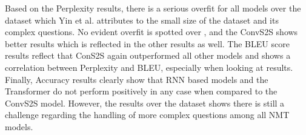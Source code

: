 Based on the Perplexity results, there is a serious overfit for all models over the \LCQuADone{} 
dataset which Yin et al. attributes to the small size of the dataset and its complex questions. 
No evident overfit is spotted over \DBNQA, and the ConvS2S shows better results which is 
reflected in the other results as well. The BLEU score results reflect that ConS2S again 
outperformed all other models and shows a correlation between Perplexity and BLEU, especially 
when looking at \DBNQA{} results. Finally, Accuracy results clearly show that RNN based models and 
the Transformer do not perform positively in any case when compared to the ConvS2S model. 
However, the results over the \LCQuADone{} dataset shows there is still a challenge regarding 
the handling of more complex questions among all NMT models.

